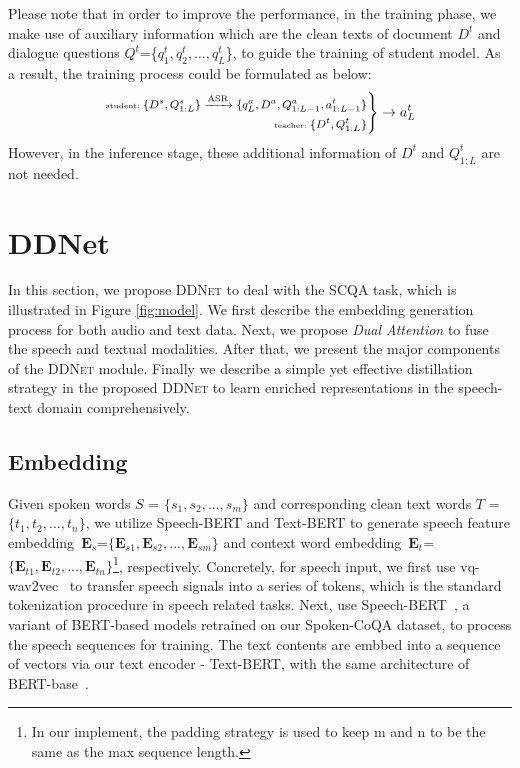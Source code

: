 \documentclass[11pt]{article}
\begin{document}
Please note that in order to improve the performance, in the training phase, we make use of auxiliary information which are the clean texts of document $D^t$ and dialogue questions $Q^t$=\{$q^t_1,q^t_2,\ldots,q^t_L$\}, to guide the training of student model. As a result, the training process could be formulated as below:
\begin{equation*}
\footnotesize\left.
\begin{aligned}
{\tiny\text{student:}\ } \{D^s,Q^s_{1:L}\}\xrightarrow{\text{ASR}}\{q^a_L,D^a,Q^a_{1:L-1},a^t_{1:L-1}\} &\\
\hfill{\tiny\text{teacher:}\ } \{D^t,Q^t_{1:L}\} &
\label{eqn:task_def}
\end{aligned}
\right\} \to a^t_L
\end{equation*}
However, in the inference stage, these additional information of $D^t$ and $Q^t_{1:L}$ are not needed.

\vspace{-0.3em}
\section{DDNet}
\vspace{-0.3em}

In this section, we propose \textsc{DDNet} to deal with the SCQA task, which is illustrated in Figure \ref{fig:model}. We first describe the embedding generation process for both audio and text data. Next, we propose {\em Dual Attention} to fuse the speech and textual modalities. After that, we present the major components of the \textsc{DDNet} module. Finally we describe a simple yet effective distillation strategy in the proposed \textsc{DDNet} to learn enriched representations in the speech-text domain comprehensively.

\vspace{-0.3em}
\subsection{Embedding}
\vspace{-0.3em}
\label{subsec:cmm}
Given spoken words $S$ = $\{{s_1},{s_2},...,{s_m}\}$  and corresponding clean text words $T$ = $\{{t_1},{t_2},...,{t_n}\}$, we utilize Speech-BERT and Text-BERT to generate speech feature embedding~$ \textbf{E}_s$=$\{ \textbf{E}_{s1}, \textbf{E}_{s2},..., \textbf{E}_{sm}\}$ and context word embedding~$ \textbf{E}_t$=$\{ \textbf{E}_{t1},\textbf{E}_{t2},...,\textbf{E}_{tn}\}$\footnote{In our implement, the padding strategy is used to keep m and n to be the same as the max sequence length.}, respectively. Concretely, for speech input, we first use vq-wav2vec~\cite{baevski2019vq} to transfer speech signals into a series of tokens, which is the standard tokenization procedure in speech related tasks. Next, use Speech-BERT~\cite{chuang2019speechbert}, a variant of BERT-based models retrained on our Spoken-CoQA dataset, to process the speech sequences for training.
The text contents are embbed into a sequence of vectors via our text encoder - Text-BERT, with the same architecture of BERT-base~\cite{devlin2018bert}.
\end{document}
